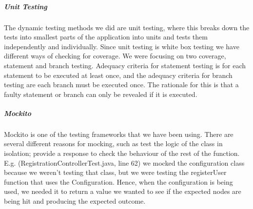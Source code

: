\documentclass[11pt,a4paper]{report}
\begin{document}
\subparagraph{Unit Testing} The dynamic testing methods we did are unit testing, where this breaks down the tests into smallest parts of the application into units and tests them independently and individually. Since unit testing is white box testing we have different ways of checking for coverage. We were focusing on two coverage, statement and branch testing. Adequacy criteria for statement testing is for each statement to be executed at least once, and the adequacy criteria for branch testing are each branch must be executed once. The rationale for this is that a faulty statement or branch can only be revealed if it is executed.

\subparagraph{Mockito}
Mockito is one of the testing frameworks that we have been using. There are several different reasons for mocking, such as test the logic of the class in isolation; provide a response to check the behaviour of the rest of the function. E.g. (RegistrationControllerTest.java, line 62) we mocked the configuration class because we weren’t testing that class, but we were testing the registerUser function that uses the Configuration. Hence, when the configuration is being used, we needed it to return a value we wanted to see if the expected nodes are being hit and producing the expected outcome.
\end{document}
